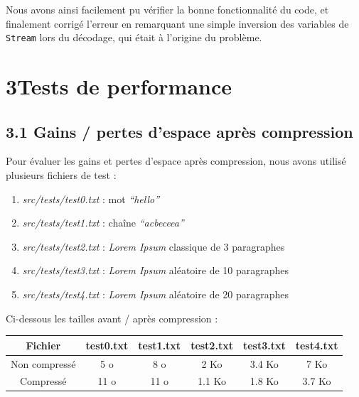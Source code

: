 \documentclass [a4paper,11pt] {report}
\begin{document}
Nous avons ainsi facilement pu vérifier la bonne fonctionnalité du code, et finalement corrigé l'erreur en remarquant une simple inversion des variables de \lstinline!Stream! lors du décodage, qui était à l'origine du problème.


\section* {3\hspace{5mm}Tests de performance }

\subsection* {3.1\hspace{3mm} Gains / pertes d'espace après compression}

Pour évaluer les gains et pertes d'espace après compression, nous avons utilisé plusieurs fichiers de test :

\begin{enumerate}

\item%
\textit{src/tests/test0.txt} : mot \textit{``hello''}

\item%
\textit{src/tests/test1.txt} : chaîne \textit{``acbeceea''}

\item%
\textit{src/tests/test2.txt} : \textit{Lorem Ipsum} classique de 3 paragraphes

\item%
\textit{src/tests/test3.txt} : \textit{Lorem Ipsum} aléatoire de 10 paragraphes

\item%
\textit{src/tests/test4.txt} : \textit{Lorem Ipsum} aléatoire de 20 paragraphes

\end{enumerate}
\vspace{0.5cm}

Ci-dessous les tailles avant / après compression :
\begin{center}
\begin{tabular}{|c|c|c|c|c|c|}
 \hline
Fichier & test0.txt & test1.txt & test2.txt & test3.txt & test4.txt\\
 \hline
Non compressé & 5 o & 8 o & 2 Ko & 3.4 Ko & 7 Ko\\
Compressé & 11 o & 11 o & 1.1 Ko & 1.8 Ko & 3.7 Ko\\
 \hline
\end{tabular}
\end{center}
\end{document}
